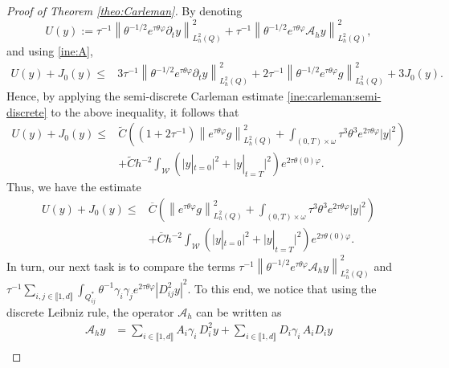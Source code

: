 \documentclass{amsart}
\numberwithin{equation}{section}
\begin{document}
\begin{proof}[Proof of Theorem \ref{theo:Carleman}]
By denoting
\begin{equation*}
U(y):= \tau^{-1}\left\|\theta^{-1/2}e^{\tau\theta\varphi}\partial_{t}y \right\|^{2}_{L^{2}_{h}(Q)}+\tau^{-1}\left\| \theta^{-1/2}e^{\tau\theta\varphi}\mathcal{A}_{h}y\right\|^{2}_{L_{h}^{2}(Q)},
\end{equation*}
and using \eqref{ine:A},
\begin{align*}
U(y)+J_0(y)\leq&3\tau^{-1}\left\|\theta^{-1/2}e^{\tau\theta\varphi}\partial_{t}y \right\|^{2}_{L^{2}_{h}(Q)}+2\tau^{-1}\left\|\theta^{-1/2}e^{\tau\theta\varphi}g\right\|^{2}_{L_{h}^{2}(Q)}+3J_0(y).
\end{align*}
Hence, by applying the semi-discrete Carleman estimate \eqref{ine:carleman:semi-discrete} to the above inequality, it follows that
\begin{equation*}
\begin{aligned}
     U(y)+J_0(y)\leq &\tilde{C}\left(\left(1+2\tau^{-1} \right)\left\|e^{\tau\theta\varphi}g\right\|^{2}_{L_{h}^{2}(Q)}+\int_{(0,T)\times\omega}\tau^3\theta^3e^{2\tau\theta\varphi}|y|^2\right)\\
     &+\tilde{C}h^{-2}\int_{\mathcal{W}} \left(\Big|y|_{t=0}\Big|^2+\Big|y|_{t=T}\Big|^2\right)e^{2\tau\theta(0)\varphi}.
\end{aligned}
\end{equation*}
Thus, we have the estimate
\begin{equation}\label{ine:new:carleman}
\begin{aligned}
     U(y)+J_0(y)\leq &\overline{C}\left(\left\|e^{\tau\theta\varphi}g\right\|^{2}_{L_{h}^{2}(Q)}+\int_{(0,T)\times\omega}\tau^3\theta^3e^{2\tau\theta\varphi}|y|^2\right)\\
     &+\overline{C}h^{-2}\int_{\mathcal{W}} \left(\Big|y|_{t=0}\Big|^2+\Big|y|_{t=T}\Big|^2\right)e^{2\tau\theta(0)\varphi}. 
\end{aligned}
\end{equation}
In turn, our next task is to compare the terms $\displaystyle \tau^{-1}\left\| \theta^{-1/2}e^{\tau\theta\varphi}\mathcal{A}_{h}y\right\|^{2}_{L_{h}^{2}(Q)}$ and \break $\displaystyle \tau^{-1}\sum_{i,j\in\llbracket 1,d\rrbracket}\int_{Q_{ij}^{\ast}} \theta^{-1}\gamma_{i}\gamma_{j}e^{2\tau\theta\varphi}|D^{2}_{ij}y|^{2}$. To this end, we notice that using the discrete Leibniz rule, the operator $\mathcal{A}_{h}$ can be written as
\begin{align*}
    \mathcal{A}_{h}y&=\sum_{i\in\llbracket 1,d\rrbracket}A_{i}\gamma_{i}\,D_{i}^{2}y+\sum_{i\in\llbracket 1,d\rrbracket}D_{i}\gamma_{i}\,A_{i}D_{i}y\\

\end{align*}
\end{proof}
\end{document}
